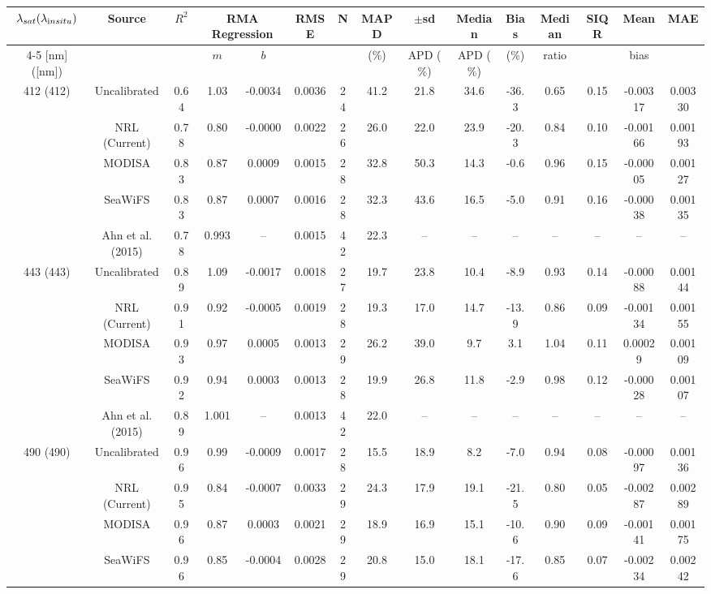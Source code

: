 \documentclass[preview]{standalone}
\begin{document}
\centering
\begin{tabular}{ccccccccccccccc} 
 \hline 
$\lambda_{sat} (\lambda_{\text in situ})$ & Source & $R^2$ & \multicolumn{2}{c}{RMA Regression} & RMSE & N & MAPD & $\pm$sd & Median & Bias & Median & SIQR & Mean & MAE\\ \cline{4-5}
[nm]([nm])                  &              &         & $m$     & $b$     &             &     & ($\%$)  & APD ($\%$)  & APD ($\%$)  & ($\%$)   & ratio   &  & bias&       \\ \hline 
 \hline  
\multirow{5}{*}{412 (412)} 	& Uncalibrated 	& 0.64 & 1.03 & -0.0034 & 0.0036 & 24 & 41.2 & 21.8 & 34.6 & -36.3 & 0.65 & 0.15 & -0.00317 & 0.00330 \\ 
							& NRL (Current)	& 0.78 & 0.80 & -0.0000 & 0.0022 & 26 & 26.0 & 22.0 & 23.9 &  -20.3 & 0.84 &  0.10 & -0.00166 & 0.00193\\
							& MODISA 		& 0.83 & 0.87 & 0.0009 & 0.0015 & 28 & 32.8 & 50.3 & 14.3 & -0.6 & 0.96 & 0.15& -0.00005 & 0.00127 \\ 
							& SeaWiFS 		& 0.83 & 0.87 & 0.0007 & 0.0016 & 28 & 32.3 & 43.6 & 16.5 & -5.0 & 0.91 & 0.16 & -0.00038 & 0.00135\\ 
							& Ahn et al. (2015) & 0.78 & 0.993 & -- & 0.0015 & 42 & 22.3 & -- & -- & -- & -- & -- & -- & -- \\ \hline
\multirow{5}{*}{443 (443)} 	& Uncalibrated 	& 0.89 & 1.09 & -0.0017 & 0.0018 & 27 & 19.7 & 23.8 & 10.4 & -8.9 & 0.93 & 0.14  & -0.00088 & 0.00144 \\ 
							& NRL (Current)	& 0.91 & 0.92 & -0.0005 & 0.0019 & 28 & 19.3 & 17.0 & 14.7 & -13.9 & 0.86 & 0.09 & -0.00134 & 0.00155\\
 							& MODISA 		& 0.93 & 0.97 & 0.0005 & 0.0013 & 29 & 26.2 & 39.0 & 9.7 & 3.1 & 1.04 & 0.11 &  0.00029 & 0.00109 \\ 
 							& SeaWiFS 		& 0.92 & 0.94 & 0.0003 & 0.0013 & 28 & 19.9 & 26.8 & 11.8 & -2.9 & 0.98 & 0.12 & -0.00028 & 0.00107\\ 

 							& Ahn et al. (2015) & 0.89 & 1.001 & -- & 0.0013 & 42 & 22.0 & -- & -- & -- & -- & -- & -- & -- \\ \hline
\multirow{5}{*}{490 (490)} 	& Uncalibrated 	& 0.96 & 0.99 & -0.0009 & 0.0017 & 28 & 15.5 & 18.9 & 8.2 & -7.0 & 0.94 & 0.08 & -0.00097 & 0.00136 \\ 
							& NRL (Current)	& 0.95 & 0.84 & -0.0007 & 0.0033 & 29 & 24.3 & 17.9 & 19.1 & -21.5 & 0.80 & 0.05 & -0.00287 & 0.00289\\
 							& MODISA 		& 0.96 & 0.87 & 0.0003 & 0.0021 & 29 & 18.9 & 16.9 & 15.1 & -10.6 & 0.90 & 0.09 & -0.00141 & 0.00175 \\ 
 							& SeaWiFS 		& 0.96 & 0.85 & -0.0004 & 0.0028 & 29 & 20.8 & 15.0 & 18.1 & -17.6 & 0.85 & 0.07  & -0.00234 & 0.00242\\ 


\end{tabular}
\end{document}
